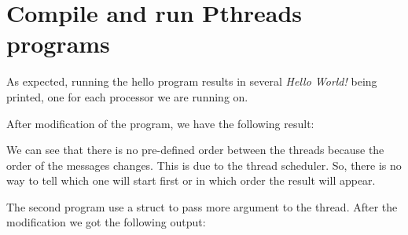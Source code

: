 \chapter{Compile and run Pthreads programs}

As expected, running the hello program results in several \textit{Hello World!} being printed, one for each processor we are running on.

After modification of the program, we have the following result:



We can see that there is no pre-defined order between the threads because the order of the messages changes. This is due to the thread scheduler. So, there is no way to tell which one will start first or in which order the result will appear.

The second program use a struct to pass more argument to the thread. After the modification we got the following output:



